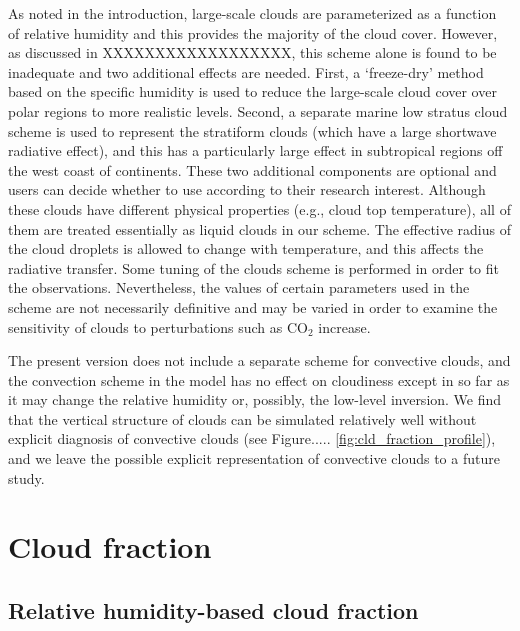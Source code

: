 As noted in the introduction, large-scale clouds are parameterized as a function of relative humidity and this provides the majority of the cloud cover. However, as discussed in XXXXXXXXXXXXXXXXXX, this scheme alone is found to be inadequate and two additional effects are needed. First, a `freeze-dry' method based on the specific humidity is used to reduce the large-scale cloud cover over polar regions to more realistic levels. Second, a separate marine low stratus cloud scheme is used to represent the stratiform clouds (which have a large shortwave radiative effect), and this has a particularly large effect in subtropical regions off the west coast of continents. These two additional components are optional and users can decide whether to use according to their research interest. Although these clouds have different physical properties (e.g., cloud top temperature), all of them are treated essentially as liquid clouds in our scheme. The effective radius of the cloud droplets is allowed to change with temperature, and this affects the radiative transfer. Some tuning of the clouds scheme is performed in order to fit the observations. Nevertheless, the values of certain parameters used in the scheme are not necessarily definitive and may be varied in order to examine the sensitivity of clouds to perturbations such as CO$_2$ increase. 

The present version does not include a separate scheme for convective clouds, and the convection scheme in the model has no effect on cloudiness except in so far as it may change the relative humidity or, possibly, the low-level inversion.
We find that the vertical structure of clouds can be simulated relatively well without explicit diagnosis of convective clouds (see Figure..... \ref{fig:cld_fraction_profile}), and we leave the possible explicit representation of convective clouds to a future study. 


\section{Cloud fraction}

\subsection{Relative humidity-based cloud fraction}
\label{sec:rh_cloud}

